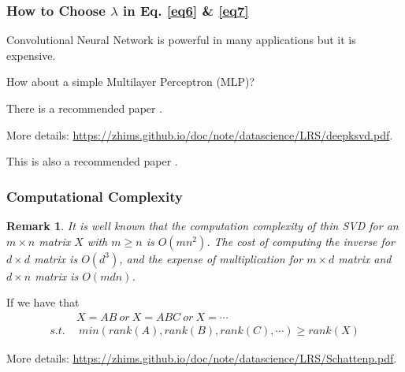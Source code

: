 \documentclass[aspectratio=2516]{beamer}
\newtheorem{remark}{Remark}
\begin{document}
\begin{frame}
\frametitle{ How to Choose $ \lambda $ in Eq. \ref{eq6} \& \ref{eq7}}


Convolutional Neural Network is powerful in many applications but it is expensive.\\

\vspace{0.5cm}

How about a simple Multilayer Perceptron (MLP)?

\vspace{0.5cm}

{\tiny There is a recommended paper {\color{blue} \cite{p2}}}.

\vspace{0.5cm}

{\tiny More details:} {\color{blue} \tiny \url{https://zhims.github.io/doc/note/datascience/LRS/deepksvd.pdf}}.

\vspace{0.5cm}

{\tiny This is  also a recommended paper {\color{blue} \cite{p3}}}.

\end{frame}


\begin{frame}

\frametitle{Computational Complexity}


\begin{remark}
	
	It is well known that the computation complexity of thin SVD for an $m \times n$ matrix $ X $ with $m \geqslant n$ is $O\left( {m{n^2}} \right)$. The cost of computing the inverse for $d \times d$ matrix is $O\left( {{d^3}} \right)$, and the expense of multiplication for $m \times d$ matrix and $d \times n$ matrix is $O\left( {mdn} \right)$.  
	\label{remark1}
\end{remark}

If we have that
\begin{equation}
\begin{split}
       & X  = AB \ or \  X  = ABC \ or \  X = \cdots \\
s.t. \ & \ min(rank(A), rank(B),rank(C),\cdots) \ge rank(X)
\end{split}
\end{equation}

{\tiny More details:} {\color{blue} \tiny \url{https://zhims.github.io/doc/note/datascience/LRS/Schattenp.pdf}}.

\label{page12}

\end{frame}
\end{document}

